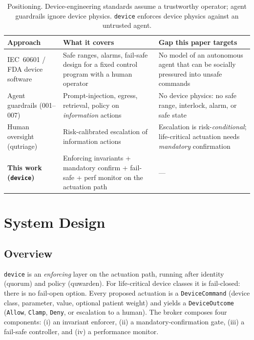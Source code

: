\documentclass[11pt]{article}
\begin{document}
\begin{table}[htb]\centering\small
\begin{tabular}{L{3.0cm}L{4.3cm}L{4.3cm}}
\toprule
Approach & What it covers & Gap this paper targets \\
\midrule
IEC~60601 / FDA device software & Safe ranges, alarms, fail-safe design for a fixed control program with a human operator & No model of an autonomous agent that can be socially pressured into unsafe commands \\
Agent guardrails (001--007) & Prompt-injection, egress, retrieval, policy on \emph{information} actions & No device physics: no safe range, interlock, alarm, or safe state \\
Human oversight (qutriage) & Risk-calibrated escalation of information actions & Escalation is risk-\emph{conditional}; life-critical actuation needs \emph{mandatory} confirmation \\
\textbf{This work (\texttt{device})} & Enforcing invariants + mandatory confirm + fail-safe + perf monitor on the actuation path & --- \\
\bottomrule
\end{tabular}
\caption{Positioning. Device-engineering standards assume a trustworthy operator;
agent guardrails ignore device physics. \texttt{device} enforces device physics
against an untrusted agent.}
\label{tab:related}
\end{table}

\section{System Design}
\subsection{Overview}
\texttt{device} is an \emph{enforcing} layer on the actuation path, running after
identity (quorum) and policy (quwarden). For life-critical device classes it is
fail-closed: there is no fail-open option. Every proposed actuation is a
\texttt{DeviceCommand} (device class, parameter, value, optional patient weight)
and yields a \texttt{DeviceOutcome} (\texttt{Allow}, \texttt{Clamp},
\texttt{Deny}, or escalation to a human). The broker composes four components:
(i) an invariant enforcer, (ii) a mandatory-confirmation gate, (iii) a fail-safe
controller, and (iv) a performance monitor.
\end{document}
